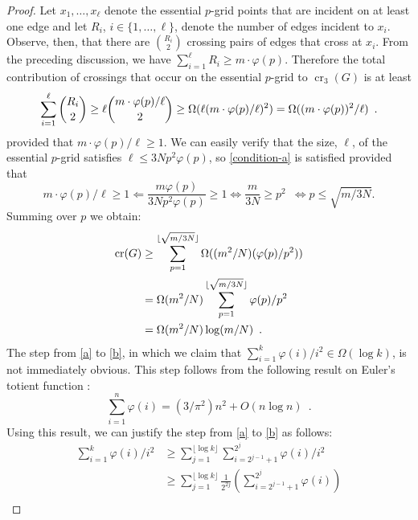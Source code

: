 \documentclass{patmorin}
\newcommand{\n}{N}
\DeclareMathOperator{\crs}{cr}
\begin{document}
\begin{proof}
  Let $x_1,\ldots,x_\ell$ denote the essential $p$-grid points that are
  incident on at least one edge and let $R_i$, $i\in\{1,\ldots,\ell\}$,
  denote the number of edges incident to $x_i$.  Observe, then, that
  there are $\binom{R_i}{2}$ crossing pairs of edges that cross at
  $x_i$.  From the preceding discussion, we have $\sum_{i=1}^\ell R_i
  \ge m\cdot\varphi(p)$.  Therefore the total contribution of crossings that
  occur on the essential $p$-grid to $\crs_3(G)$ is at least
  \begin{equation}
      \sum_{i=1}^\ell\binom{R_i}{2} \ge \ell \binom{m\cdot\varphi(p)/\ell}{2}
      \ge \Omega(\ell (m\cdot\varphi(p)/\ell)^2)
      = \Omega((m\cdot\varphi(p))^2/\ell) \enspace . \eqlabel{condition-a}
  \end{equation}
  provided that $m\cdot\varphi(p)/\ell \ge 1$.  We can easily verify
  that the size, $\ell$, of the essential $p$-grid satisfies $\ell \le
  3\n p^2\varphi(p)$, so \eqref{condition-a} is satisfied provided that
  \[
     m\cdot\varphi(p)/\ell \ge 1 \Leftarrow \frac{m\varphi(p)}{3\n p^2\varphi(p)} \ge 1 \Leftrightarrow \frac{m}{3\n} \ge p^2 \enspace \Leftrightarrow
   p \le \sqrt{m/3\n}.
  \]
  Summing over $p$ we obtain:
  \begin{align}
     \crs(G) & \ge \sum_{p=1}^{\lfloor\sqrt{m/3\n}\rfloor} \Omega((m^2/\n)(\varphi(p)/p^2)) \\
             & = \Omega(m^2/\n)\sum_{p=1}^{\lfloor\sqrt{m/3\n}\rfloor} \varphi(p)/p^2 \eqlabel{a} \\
             & = \Omega(m^2/\n)\log(m/\n) \enspace . \eqlabel{b}
  \end{align}
  The step from \eqref{a} to \eqref{b}, in which we claim that
  $\sum_{i=1}^k \varphi(i)/i^2\in\Omega(\log k)$, is not immediately
  obvious.
  This step follows from the following result on Euler's
  totient function \cite[Theorem~330]{hardy.wright:introduction}:
  \[
      \sum_{i=1}^n \varphi(i) = (3/\pi^2)n^2 + O(n\log n) \enspace .
  \]
  Using this result, we can justify the step from \eqref{a} to \eqref{b}
  as follows:
  \begin{align*}
    \sum_{i=1}^k \varphi(i)/i^2 
      &\ge \sum_{j=1}^{\lfloor\log k\rfloor}
             \sum_{i=2^{j-1}+1}^{2^j} \varphi(i)/i^2  \\
      &\ge \sum_{j=1}^{\lfloor\log k\rfloor}\frac{1}{2^{2j}}
             \left(\sum_{i=2^{j-1}+1}^{2^j} \varphi(i)\right)  \\

\end{align*}
\end{proof}
\end{document}
